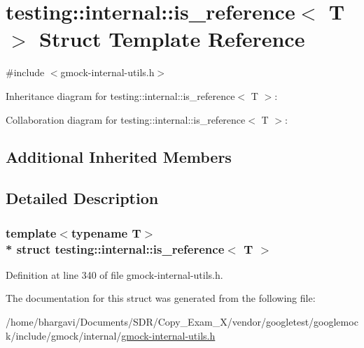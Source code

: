 \hypertarget{structtesting_1_1internal_1_1is__reference}{}\section{testing\+:\+:internal\+:\+:is\+\_\+reference$<$ T $>$ Struct Template Reference}
\label{structtesting_1_1internal_1_1is__reference}


{\ttfamily \#include $<$gmock-\/internal-\/utils.\+h$>$}



Inheritance diagram for testing\+:\+:internal\+:\+:is\+\_\+reference$<$ T $>$\+:


Collaboration diagram for testing\+:\+:internal\+:\+:is\+\_\+reference$<$ T $>$\+:
\subsection*{Additional Inherited Members}


\subsection{Detailed Description}
\subsubsection*{template$<$typename T$>$\\*
struct testing\+::internal\+::is\+\_\+reference$<$ T $>$}



Definition at line 340 of file gmock-\/internal-\/utils.\+h.



The documentation for this struct was generated from the following file\+:\begin{DoxyCompactItemize}
\item 
/home/bhargavi/\+Documents/\+S\+D\+R/\+Copy\+\_\+\+Exam\+\_\+X/vendor/googletest/googlemock/include/gmock/internal/\hyperlink{gmock-internal-utils_8h}{gmock-\/internal-\/utils.\+h}\end{DoxyCompactItemize}
